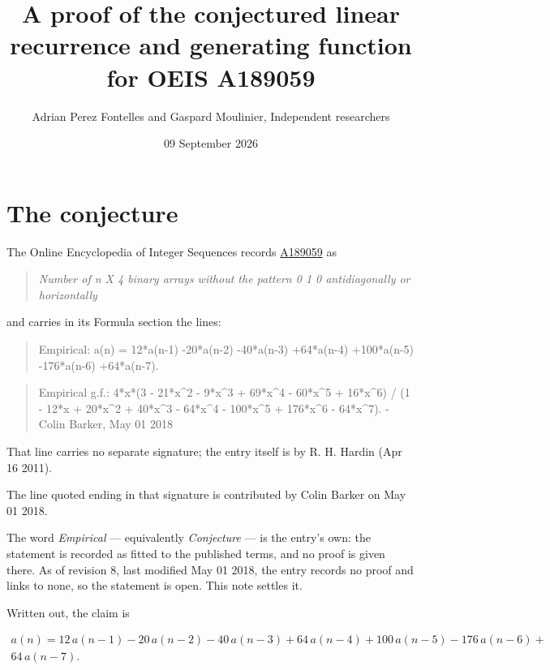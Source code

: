 \documentclass[11pt]{article}
\title{A proof of the conjectured linear recurrence and generating function for OEIS A189059}
\author{Adrian Perez Fontelles and Gaspard Moulinier, Independent researchers}
\date{09 September 2026}
\theoremstyle{definition}
\begin{document}
\maketitle
\section{The conjecture}

The Online Encyclopedia of Integer Sequences records \href{https://oeis.org/A189059}{A189059} as

\begin{quote}\itshape Number of n X 4 binary arrays without the pattern 0 1 0 antidiagonally or horizontally\end{quote}

and carries in its Formula section the lines:

\begin{quote}\ttfamily Empirical: a(n) = 12*a(n-1) -20*a(n-2) -40*a(n-3) +64*a(n-4) +100*a(n-5) -176*a(n-6) +64*a(n-7).\end{quote}

\begin{quote}\ttfamily Empirical g.f.: 4*x*(3 - 21*x\textasciicircum{}2 - 9*x\textasciicircum{}3 + 69*x\textasciicircum{}4 - 60*x\textasciicircum{}5 + 16*x\textasciicircum{}6) / (1 - 12*x + 20*x\textasciicircum{}2 + 40*x\textasciicircum{}3 - 64*x\textasciicircum{}4 - 100*x\textasciicircum{}5 + 176*x\textasciicircum{}6 - 64*x\textasciicircum{}7). - Colin Barker, May 01 2018\end{quote}

That line carries no separate signature; the entry itself is by R. H. Hardin (Apr 16 2011).

The line quoted ending in that signature is contributed by Colin Barker on May 01 2018.

The word {\itshape Empirical} --- equivalently {\itshape Conjecture} --- is the entry's own: the statement is recorded as fitted to the published terms, and no proof is given there. As of revision 8, last modified May 01 2018, the entry records no proof and links to none, so the statement is open. This note settles it.

Written out, the claim is

\begin{multline*} a(n) = 12\,a(n-1) - 20\,a(n-2) - 40\,a(n-3) + 64\,a(n-4) + 100\,a(n-5) - 176\,a(n-6) + \\ 64\,a(n-7). \end{multline*}
\end{document}
